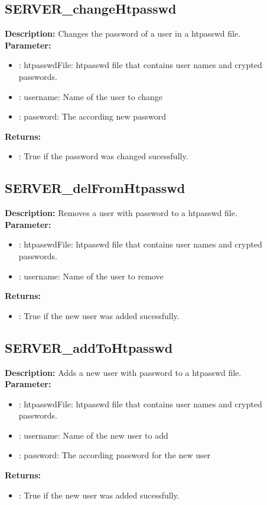 \subsection{SERVER\_changeHtpasswd}
\textbf{Description:} Changes the password of a user in a htpasswd file.\\
\textbf{Parameter:}
\begin{itemize}
\item : htpasswdFile: htpasswd file that contains user names and crypted passwords.
\item : username: Name of the user to change
\item : password: The according new password
\end{itemize}
\textbf{Returns:}
\begin{itemize}
\item : True if the password was changed sucessfully.
\end{itemize}

\subsection{SERVER\_delFromHtpasswd}
\textbf{Description:} Removes a user with password to a htpasswd file.\\
\textbf{Parameter:}
\begin{itemize}
\item : htpasswdFile: htpasswd file that contains user names and crypted passwords.
\item : username: Name of the user to remove
\end{itemize}
\textbf{Returns:}
\begin{itemize}
\item : True if the new user was added sucessfully.
\end{itemize}

\subsection{SERVER\_addToHtpasswd}
\textbf{Description:} Adds a new user with password to a htpasswd file.\\
\textbf{Parameter:}
\begin{itemize}
\item : htpasswdFile: htpasswd file that contains user names and crypted passwords.
\item : username: Name of the new user to add
\item : password: The according password for the new user
\end{itemize}
\textbf{Returns:}
\begin{itemize}
\item : True if the new user was added sucessfully.
\end{itemize}

